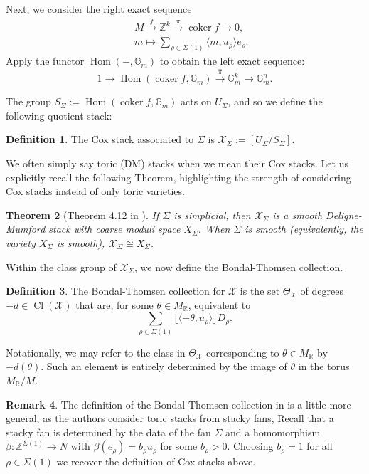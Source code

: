 \documentclass[reqno, 12pt]{amsart}
\newtheorem{theorem}{Theorem}[section]
\theoremstyle{definition}
\newtheorem{definition}[theorem]{Definition}
\newtheorem{remark}[theorem]{Remark}
\numberwithin{equation}{section}
\newcommand{\newterm}{\textsf}
\newcommand{\Hom}{\operatorname{Hom}}
\newcommand{\Z}{\mathbb{Z}}
\newcommand{\R}{\mathbb{R}}
\begin{document}
Next, we consider the right exact sequence
\begin{eqnarray}\label{eqn:Coxseqpre}
    && M\xrightarrow{f}\Z^k\xrightarrow{\pi}\operatorname{coker}f\rightarrow 0,\\
   &&  m\mapsto \sum_{\rho\in\Sigma(1)}\langle m,u_\rho\rangle e_\rho\nonumber.\;
\end{eqnarray}
Apply the functor $\Hom(-,\mathbb{G}_m)$ to obtain the left exact sequence:
\[
1\rightarrow \Hom(\operatorname{coker}f,\mathbb{G}_m)\xrightarrow{\hat{\pi}}\mathbb{G}_m^k\rightarrow \mathbb{G}_m^n.
\]

The group $S_\Sigma:=\Hom(\operatorname{coker}f,\mathbb{G}_m)$ acts on $U_\Sigma$, and so we define the following quotient stack:
\begin{definition}
    \label{Def:Coxstack}
    The \newterm{Cox stack} associated to $\Sigma$ is
    $\mathcal{X}_\Sigma:=[U_\Sigma/S_\Sigma].$
\end{definition}

We often simply say toric (DM) stacks when we mean their Cox stacks. Let us explicitly recall the following Theorem, highlighting the strength of considering Cox stacks instead of only toric varieties.
\begin{theorem}[Theorem 4.12 in \cite{FK18}]
    \label{Thm:4.12FK18}
    If $\Sigma$ is simplicial, then $\mathcal{X}_\Sigma$ is a smooth Deligne-Mumford stack with coarse moduli space $X_\Sigma$. When $\Sigma$ is smooth (equivalently, the variety $X_\Sigma$ is smooth), $\mathcal{X}_\Sigma\cong X_\Sigma$.
\end{theorem}

Within the class group of $\mathcal{X}_\Sigma$, we now define the Bondal-Thomsen collection.
\begin{definition}
    \label{Def:BTcolln}
    The \newterm{Bondal-Thomsen collection} for $\mathcal{X}$ is the set $\Theta_{\mathcal{X}}$ of degrees $-d\in \operatorname{Cl}(\mathcal{X})$ that are, for some $\theta\in M_\R$, equivalent to
    \[
    \sum_{\rho\in\Sigma(1)}\lfloor\langle-\theta,u_\rho\rangle\rfloor D_\rho.
    \]
\end{definition}

Notationally, we may refer to the class in $\Theta_\mathcal{X}$ corresponding to $\theta\in M_\R$ by $-d(\theta)$. Such an element is entirely determined by the image of $\theta$ in the torus $M_\R/M$. 

\begin{remark}
    The definition of the Bondal-Thomsen collection in \cite{BBB+} is a little more general, as the authors consider toric stacks from stacky fans, Recall that a stacky fan is determined by the data of the fan $\Sigma$ and a homomorphism $\beta:\Z^{\Sigma(1)}\rightarrow N$ with $\beta(e_\rho)=b_\rho u_\rho$ for some $b_\rho>0$. Choosing $b_\rho=1$ for all $\rho\in\Sigma(1)$ we recover the definition of Cox stacks above.
\end{remark}
\end{document}
